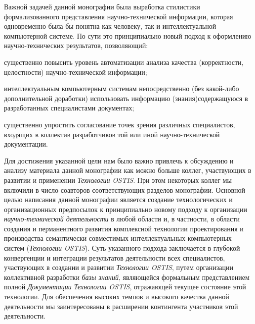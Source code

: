 \begin{SCn}
{Важной задачей данной монографии была выработка стилистики формализованного представления научно-технической информации, которая одновременно была бы понятна как человеку, так и интеллектуальной компьютерной системе. По сути это принципиально новый подход к оформлению научно-технических результатов, позволяющий:
\begin{scnitemize}
 \item существенно повысить уровень автоматизации анализа качества (корректности, целостности) научно-технической информации;
 \item интеллектуальным компьютерным системам непосредственно (без какой-либо дополнительной  доработки) использовать информацию (знания)содержащуюся в разработанных специалистами документах;
 \item существенно упростить согласование точек зрения различных специалистов, входящих в коллектив разработчиков той или  иной научно-технической документации.
\end{scnitemize}
Для достижения указанной цели нам было важно привлечь к обсуждению и анализу материала данной монографии как можно больше коллег, участвующих в развитии и применении \textit{Технологии OSTIS}. При этом некоторых коллег мы включили в число соавторов соответствующих разделов монографии.
Основной целью написания данной монографии является создание технологических и организационных предпосылок к принципиально новому  подходу к организации \textit{научно-технической деятельности} в любой области и, в частности, в области создания и перманентного развития комплексной технологии проектирования и производства семантически совместимых интеллектуальных компьютерных систем (\textit{Технологии OSTIS}). Суть указанного подхода заключается  в глубокой конвергенции и интеграции результатов деятельности всех специалистов, участвующих в создании и развитии \textit{Технологии OSTIS}, путем организации коллективной разработки \textit{базы знаний}, являющейся формальным представлением полной \textit{Документации Технологии OSTIS}, отражающей текущее состояние этой технологии. Для обеспечения высоких темпов и высокого качества данной деятельности мы заинтересованы в расширении контингента участников этой деятельности.

}
\end{SCn}
